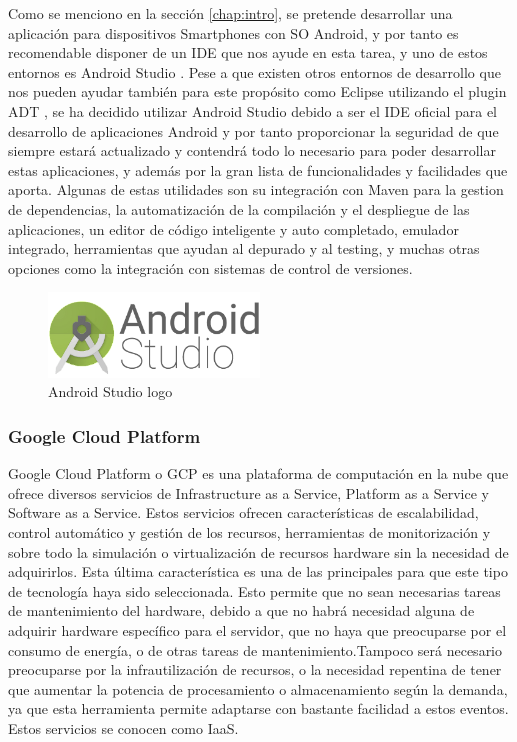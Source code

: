 Como se menciono en la sección \ref{chap:intro}, se pretende desarrollar una aplicación para dispositivos Smartphones con \acs{SO} Android, y por tanto es recomendable disponer de un \acs{IDE} que nos ayude en esta tarea, y uno de estos entornos es Android Studio \cite{AndroidStudio}. Pese a que existen otros entornos de desarrollo que nos pueden ayudar también para este propósito como Eclipse utilizando el plugin \acs{ADT} \cite{EclipseADT}, se ha decidido utilizar Android Studio debido a ser el \acs{IDE} oficial para el desarrollo de aplicaciones Android y por tanto proporcionar la seguridad de que siempre estará actualizado y contendrá todo lo necesario para poder desarrollar estas aplicaciones, y además por la gran lista de funcionalidades y facilidades que aporta. Algunas de estas utilidades son su integración con Maven para la gestion de dependencias, la automatización de la compilación y el despliegue de las aplicaciones, un editor de código inteligente y auto completado, emulador integrado, herramientas que ayudan al depurado y al testing, y muchas otras opciones como la integración con sistemas de control de versiones.

\begin{figure}[!h]
\begin{center}
\includegraphics[width=0.5\textwidth]{./figures/android-studio.png}
\caption{Android Studio logo}
\label{fig:android-studio}
\end{center}
\end{figure}

\subsubsection{Google Cloud Platform}
\label{GCP}

Google Cloud Platform o \acs{GCP} es una plataforma de computación en la nube \cite{CloudComputing} que ofrece diversos servicios de Infrastructure as a Service, Platform as a Service y Software as a Service. Estos servicios ofrecen características de escalabilidad, control automático y gestión de los recursos, herramientas de monitorización y sobre todo la simulación o virtualización de recursos hardware sin la necesidad de adquirirlos. Esta última característica es una de las principales para que este tipo de tecnología haya sido seleccionada. Esto permite que no sean necesarias tareas de mantenimiento del hardware, debido a que no habrá necesidad alguna de adquirir hardware específico para el servidor, que no haya que preocuparse por el consumo de energía, o de otras tareas de mantenimiento.Tampoco será necesario preocuparse por la infrautilización de recursos, o la necesidad repentina de tener que aumentar la potencia de procesamiento o almacenamiento según la demanda, ya que esta herramienta permite adaptarse con bastante facilidad a estos eventos. Estos servicios se conocen como \acs{IaaS}.

